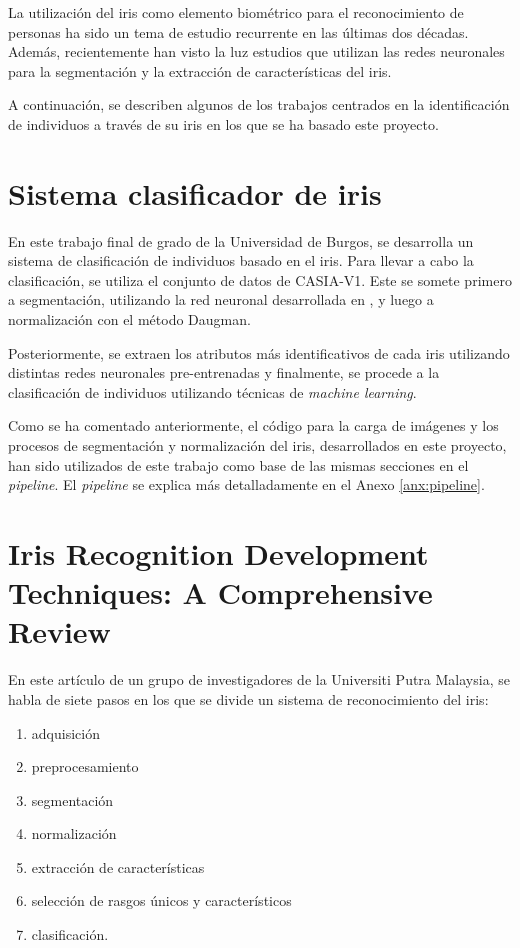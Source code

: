  \label{capitulo6}

La utilización del iris como elemento biométrico para el reconocimiento de personas ha sido un tema de estudio recurrente en las últimas dos décadas.
Además, recientemente han visto la luz estudios que utilizan las redes neuronales para la segmentación y la extracción de características del iris.

A continuación, se describen algunos de los trabajos centrados en la identificación de individuos a través de su iris en los que se ha basado este proyecto.

\section{Sistema clasificador de iris}

En este trabajo final de grado \cite{tfg_iris_2020} de la Universidad de Burgos, se desarrolla un sistema de clasificación  de individuos basado en el iris. Para llevar a cabo la clasificación, se utiliza el conjunto de datos 
de CASIA-V1. Este se somete primero a segmentación, utilizando la red neuronal desarrollada en \cite{lozej_end--end_2018}, y luego a normalización con el método Daugman. 

Posteriormente, se extraen los atributos más identificativos de cada iris utilizando distintas redes neuronales pre-entrenadas y finalmente, se procede a la clasificación de individuos utilizando técnicas de \textit{machine learning}.

Como se ha comentado anteriormente, el código para la carga de imágenes y los procesos de segmentación y normalización del iris, desarrollados en este proyecto, han sido utilizados de este trabajo como 
base de las mismas secciones en el \textit{pipeline}. El \textit{pipeline} se explica más detalladamente en el Anexo \ref{anx:pipeline}.

\section{Iris Recognition Development Techniques: A Comprehensive Review}

En este artículo \cite{malgheet_iris_2021} de un grupo de investigadores de la Universiti Putra Malaysia, se habla de siete pasos en los que se divide un sistema de reconocimiento del iris:
\begin{enumerate}
\item adquisición
\item preprocesamiento
\item segmentación
\item normalización
\item extracción de características
\item selección de rasgos únicos y característicos
\item clasificación. 
\end{enumerate}
 

